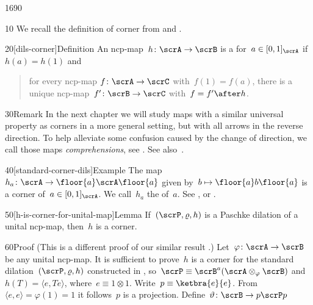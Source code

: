 \begin{parsec}{1690}%
\begin{point}{10}%
We recall the definition of corner
        from \cite[dfn.~2]{westerbaan2016universal} and .
\end{point}
\begin{point}{20}[dils-corner]{Definition}%
An ncp-map~$h \colon \scrA \to \scrB$
is a  for~$a \in [0,1]_\scrA$ if~$h(a)=h(1)$
    and
    \begin{quote}
        for every ncp-map $f\colon \scrA \to \scrC$
            with~$f(1)=f(a)$,
            there is a unique ncp-map~$f'\colon \scrB \to \scrC$
            with~$f = f' \after h$.
    \end{quote}
\spacingfix{}
\begin{point}{30}{Remark}%
In the next chapter we will study maps with a similar universal property
    as corners in a more general setting,
    but with all arrows in the reverse direction.
To help alleviate some confusion caused by the change of direction,
    we call those maps \emph{comprehensions},
    see .  See also~\cite{effintro}.
\end{point}
\end{point}
\begin{point}{40}[standard-corner-dils]{Example}%
    The map~$h_a \colon \scrA \to \floor{a} \scrA \floor{a}$ given
    by~$b \mapsto \floor{a} b \floor{a}$
    is a corner of~$a \in [0,1]_\scrA$.
    We call~$h_a$ the  of~$a$.
    See , 
        or \cite[prop.~5]{westerbaan2016universal}.
\end{point}
\begin{point}{50}[h-is-corner-for-unital-map]{Lemma}%
If~$(\scrP, \varrho, h)$ is a Paschke dilation of a unital ncp-map,
    then~$h$ is a corner.
\begin{point}{60}{Proof}%
(This is a different proof of our similar result \cite[cor.~27]{wwpaschke}.)
Let~$\varphi \colon \scrA \to \scrB$ be any unital ncp-map.
It is sufficient to prove~$h$
    is a corner for the
    standard dilation~$(\scrP , \varrho, h)$
    constructed in ,
    so~$\scrP \equiv \scrB^a(\scrA \otimes_\varphi \scrB)$
    and~$h(T) = \langle e, T e\rangle$, where~$e \equiv 1\otimes 1$.
    Write~$p \equiv \ketbra{e}{e}$.
From~$\langle e,e\rangle = \varphi(1) = 1$
    it follows~$p$ is a projection.
Define~$\vartheta\colon \scrB \to p \scrP p$

\end{point}
\end{point}
\end{parsec}
